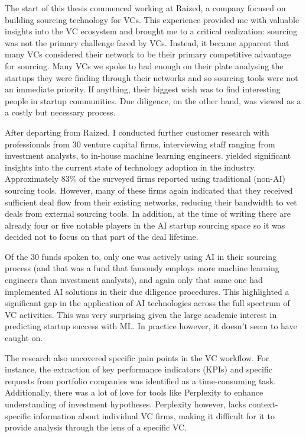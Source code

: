 \documentclass[a4paper, oneside]{discothesis}
\begin{document}
The start of this thesis commenced working at Raized, a company focused on building sourcing technology for VCs. This experience provided me with valuable insights into the VC ecosystem and brought me to a critical realization: sourcing was not the primary challenge faced by VCs. Instead, it became apparent that many VCs considered their network to be their primary competitive advantage for sourcing. Many VCs we spoke to had enough on their plate analysing the startups they were finding through their networks and so sourcing tools were not an immediate priority. If anything, their biggest wish was to find interesting people in startup communities. Due diligence, on the other hand, was viewed as a a costly but necessary process.

After departing from Raized, I conducted further customer research with professionals from 30 venture capital firms, interviewing staff ranging from investment analysts, to in-house machine learning engineers. yielded significant insights into the current state of technology adoption in the industry. Approximately 83\% of the surveyed firms reported using traditional (non-AI) sourcing tools. However, many of these firms again indicated that they received sufficient deal flow from their existing networks, reducing their bandwidth to vet deals from external sourcing tools. In addition, at the time of writing there are already four or five notable players in the AI startup sourcing space so it was decided not to focus on that part of the deal lifetime.

Of the 30 funds spoken to, only one was actively using AI in their sourcing process (and that was a fund that famously employs more machine learning engineers than investment analysts), and again only that same one had implemented AI solutions in their due diligence procedures. This highlighted a significant gap in the application of AI technologies across the full spectrum of VC activities. This was very surprising given the large academic interest in predicting startup success with ML. In practice however, it doesn't seem to have caught on. 

The research also uncovered specific pain points in the VC workflow. For instance, the extraction of key performance indicators (KPIs) and specific requests from portfolio companies was identified as a time-consuming task. Additionally, there was a lot of love for tools like  Perplexity to enhance understanding of investment hypotheses. Perplexity however, lacks context-specific information about individual VC firms, making it difficult for it to provide analysis through the lens of a specific VC.
\end{document}
